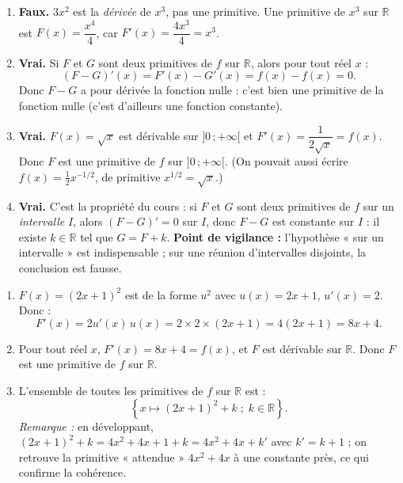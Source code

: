 \documentclass[11pt]{article}
\begin{document}
\begin{corrige}
\begin{enumerate}
\item \textbf{Faux.} $3x^2$ est la \emph{dérivée} de $x^3$, pas une primitive. Une primitive de $x^3$ sur $\mathbb{R}$ est $F(x) = \dfrac{x^4}{4}$, car $F'(x) = \dfrac{4x^3}{4} = x^3$.
\item \textbf{Vrai.} Si $F$ et $G$ sont deux primitives de $f$ sur $\mathbb{R}$, alors pour tout réel $x$ :
\[
(F - G)'(x) = F'(x) - G'(x) = f(x) - f(x) = 0.
\]
Donc $F - G$ a pour dérivée la fonction nulle : c'est bien une primitive de la fonction nulle (c'est d'ailleurs une fonction constante).
\item \textbf{Vrai.} $F(x) = \sqrt{x}$ est dérivable sur $]0\,;+\infty[$ et $F'(x) = \dfrac{1}{2\sqrt{x}} = f(x)$. Donc $F$ est une primitive de $f$ sur $]0\,;+\infty[$. (On pouvait aussi écrire $f(x) = \tfrac{1}{2}x^{-1/2}$, de primitive $x^{1/2} = \sqrt{x}$.)
\item \textbf{Vrai.} C'est la propriété du cours : si $F$ et $G$ sont deux primitives de $f$ sur un \emph{intervalle} $I$, alors $(F-G)' = 0$ sur $I$, donc $F - G$ est constante sur $I$ : il existe $k \in \mathbb{R}$ tel que $G = F + k$. \textbf{Point de vigilance :} l'hypothèse « sur un intervalle » est indispensable ; sur une réunion d'intervalles disjoints, la conclusion est fausse.
\end{enumerate}
\end{corrige}

\begin{corrige}
\begin{enumerate}
\item $F(x) = (2x+1)^2$ est de la forme $u^2$ avec $u(x) = 2x+1$, $u'(x) = 2$. Donc :
\[
F'(x) = 2u'(x)\,u(x) = 2 \times 2 \times (2x+1) = 4(2x+1) = 8x + 4.
\]
\item Pour tout réel $x$, $F'(x) = 8x + 4 = f(x)$, et $F$ est dérivable sur $\mathbb{R}$. Donc $F$ est une primitive de $f$ sur $\mathbb{R}$.
\item L'ensemble de toutes les primitives de $f$ sur $\mathbb{R}$ est :
\[
\left\{ x \mapsto (2x+1)^2 + k \; ; \; k \in \mathbb{R} \right\}.
\]
\emph{Remarque :} en développant, $(2x+1)^2 + k = 4x^2 + 4x + 1 + k = 4x^2 + 4x + k'$ avec $k' = k+1$ ; on retrouve la primitive « attendue » $4x^2 + 4x$ à une constante près, ce qui confirme la cohérence.
\end{enumerate}
\end{corrige}
\end{document}
